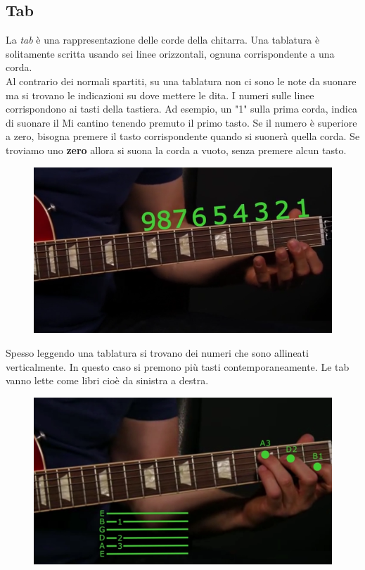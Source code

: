 \subsection{Tab}
La \textit{tab} è una rappresentazione delle corde della chitarra. Una tablatura è solitamente scritta usando sei linee orizzontali, ognuna corrispondente a una corda.\\
Al contrario dei normali spartiti, su una tablatura non ci sono le note da suonare ma si trovano le indicazioni su dove mettere le dita. I numeri sulle linee corrispondono ai tasti della tastiera. Ad esempio, un "1" sulla prima corda, indica di suonare il Mi cantino tenendo premuto il primo tasto.
Se il numero è superiore a zero, bisogna premere il tasto corrispondente quando si suonerà quella corda. Se troviamo uno \textbf{zero} allora si suona la corda a vuoto, senza premere alcun tasto.
\begin{figure}[H]
	\centering
	\includegraphics[scale=0.50]{./images/img15.png}
\end{figure}

Spesso leggendo una tablatura si trovano dei numeri che sono allineati verticalmente. In questo caso si premono più tasti contemporaneamente. Le tab vanno lette come libri cioè da sinistra a destra.
\begin{figure}[H]
	\centering
	\includegraphics[scale=0.50]{./images/img16.png}
\end{figure}